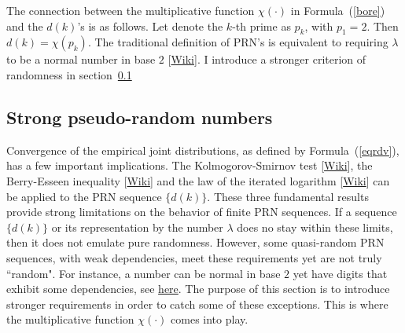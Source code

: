 \documentclass[oneside,10pt]{book}
\begin{document}
The connection between the multiplicative function $\chi(\cdot)$ in Formula~(\ref{bore}) and the $d(k)$'s is as follows. Let denote the $k$-th prime as $p_k$, with $p_1=2$. Then $d(k)=\chi(p_k)$. The traditional definition of PRN's is equivalent to requiring $\lambda$ to
be a \textcolor{index}{normal number} in base $2$ [\href{https://en.wikipedia.org/wiki/Normal_number}{Wiki}]. I introduce a stronger
 criterion of randomness in section~\ref{sprng}


\subsection{Strong pseudo-random numbers}\label{sprng}

Convergence of the empirical joint distributions, as defined by Formula~(\ref{eqrdv}), has a few important implications.
The \textcolor{index}{Kolmogorov-Smirnov test} [\href{https://en.wikipedia.org/wiki/Kolmogorov\%E2\%80\%93Smirnov_test}{Wiki}], the \textcolor{index}{Berry-Esseen inequality} [\href{https://en.wikipedia.org/wiki/Berry\%E2\%80\%93Esseen_theorem}{Wiki}]
and the \textcolor{index}{law of the iterated logarithm} [\href{https://en.wikipedia.org/wiki/Law_of_the_iterated_logarithm}{Wiki}] can be applied to the PRN sequence $\{d(k)\}$. These three fundamental results provide strong limitations on the behavior of finite PRN
 sequences. If a sequence $\{d(k)\}$ or its representation by the number $\lambda$ does no stay within these limits,
  then it does not emulate pure randomness.  However, some quasi-random PRN sequences, with weak dependencies, meet these requirements yet are not truly ``random". For instance, a number can be normal in base $2$ yet have digits that exhibit some dependencies,
 see \href{https://mathoverflow.net/questions/426815/normal-numbers-and-law-of-the-iterated-logarithm}{here}.  The purpose of this section is to introduce stronger requirements in order to catch some of these exceptions. This is where the multiplicative function $\chi(\cdot)$ comes into play.
\end{document}
